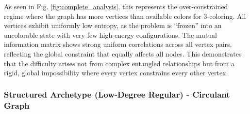 \documentclass[12pt, letterpaper]{article}
\begin{document}
As seen in Fig. \ref{fig:complete_analysis}, this represents the over-constrained regime where the graph has more vertices than available colors for 3-coloring. All vertices exhibit uniformly low entropy, as the problem is ``frozen'' into an uncolorable state with very few high-energy configurations. The mutual information matrix shows strong uniform correlations across all vertex pairs, reflecting the global constraint that equally affects all nodes. This demonstrates that the difficulty arises not from complex entangled relationships but from a rigid, global impossibility where every vertex constrains every other vertex.

\subsubsection{Structured Archetype (Low-Degree Regular) - Circulant Graph}
\end{document}
